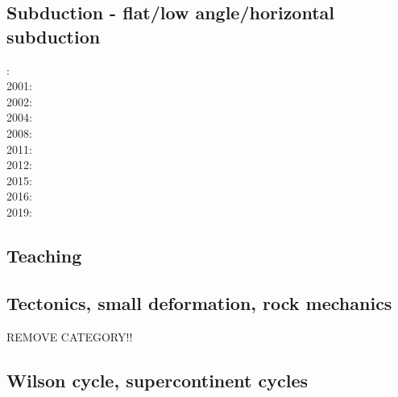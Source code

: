 \subsection{Subduction - flat/low angle/horizontal subduction}

{\scriptsize
{}: \cite{vavv00}\\
2001: \cite{vavv01}\\
2002: \cite{vavv02}\cite{vavv02b}\\
2004: \cite{vavv04d}\\
2008: \cite{pekh08}\cite{esfm08}\\
2011: \cite{cube11}\\
2012: \cite{mapm12}\cite{ronb12}\\
2015: \cite{gehm15}\cite{tarn15}\cite{ealw15}\\
2016: \cite{chdf16}\\
2019: \cite{sifg19}\cite{sams19b}\cite{malg19}
}
\subsection{Teaching} 

{\scriptsize
\cite{grap11}
\cite{kerh14}
\cite{bemg19}
}
\subsection{Tectonics, small deformation, rock mechanics}
REMOVE CATEGORY!!
{\scriptsize
\noindent
\cite{ilma93}
\cite{hept96}
}

\subsection{Wilson cycle, supercontinent cycles}

{\scriptsize
\noindent
\cite{trry95}
\cite{evan03}
\cite{zhzl07}\cite{copb07}\cite{phbu07}
\cite{zhzm09}\cite{onlj09}
\cite{lemj11}\cite{burk11}
\cite{buto14}\cite{helo14}\cite{roct14}
\cite{woda17}
\cite{begb19}\cite{wihb19}
}

